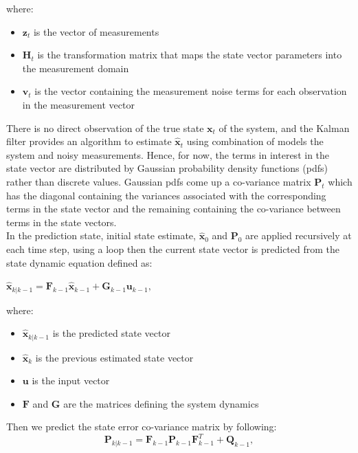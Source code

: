    \hspace{0.45cm}where:
   \begin{itemize}
       \item $\textbf{z}_t$ is the vector of measurements
       \item $\textbf{H}_t$ is the transformation matrix that maps the state vector parameters into the measurement domain
       \item $\textbf{v}_t$ is the vector containing the measurement noise terms for each observation in the measurement vector
   \end{itemize}\par
   There is no direct observation of the true state $\textbf{x}_t$ of the system, and the Kalman filter provides an algorithm to estimate $\hat{\textbf{x}}_t$ using combination of models the system and noisy measurements. Hence, for now, the terms in interest in the state vector are distributed by Gaussian probability density functions (\acrshort{pdfs}) rather than discrete values. Gaussian \acrshort{pdfs} come up a co-variance matrix $\textbf{P}_t$ which has the diagonal containing the variances associated with the corresponding terms in the state vector and the remaining containing the co-variance between terms in the state vectors.\\
   In the prediction state, initial state estimate, $\hat{\textbf{x}}_0$ and $\textbf{P}_0$ are applied recursively at each time step, using a loop then the current state vector is predicted from the state dynamic equation defined as:
   \begin{center}
       $
           \hat{\textbf{x}}_{k|k-1} = \textbf{F}_{k-1}\hat{\textbf{x}}_{k-1} + \textbf{G}_{k-1}\textbf{u}_{k-1}, 
       $
   \end{center}
   \hspace{0.45cm}where:
   \begin{itemize}
       \item $\hat{\textbf{x}}_{k|k-1}$ is the predicted state vector
       \item $\hat{\textbf{x}}_{k}$ is the previous estimated state vector
       \item $\textbf{u}$ is the input vector
       \item $\textbf{F}$ and $\textbf{G}$ are the matrices defining the system dynamics
   \end{itemize}
   
   \hspace{0.45cm}Then we predict the state error co-variance matrix by following:
   \begin{equation}
             \textbf{P}_{k|k-1} = \textbf{F}_{k-1}\textbf{P}_{k-1}\textbf{F}^T_{k-1} + \textbf{Q}_{k-1}, 
   \end{equation}
   
